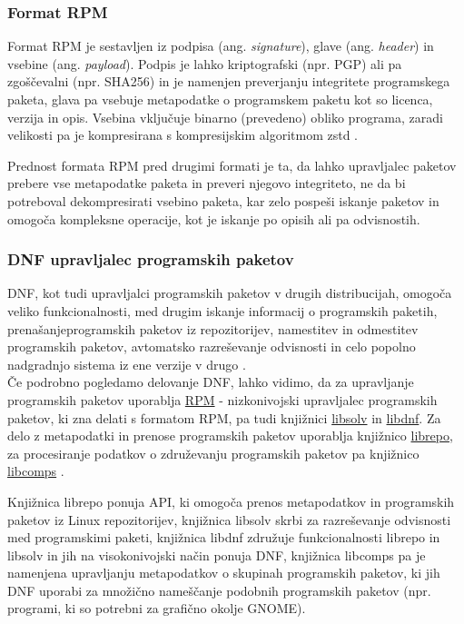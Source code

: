 \subsubsection{Format RPM}

Format RPM je sestavljen iz podpisa (ang. \emph{signature}), glave (ang. \emph{header}) in vsebine
(ang. \emph{payload}).
Podpis je lahko kriptografski (npr. PGP) ali pa zgoščevalni (npr. SHA256) in je namenjen preverjanju integritete
programskega paketa, glava pa vsebuje metapodatke o programskem paketu kot so licenca, verzija in opis.
Vsebina vključuje binarno (prevedeno) obliko programa, zaradi velikosti pa je kompresirana
s kompresijskim algoritmom zstd \cite{fedora-zstd}.

Prednost formata RPM pred drugimi formati je ta, da lahko upravljalec paketov prebere vse metapodatke paketa in preveri
njegovo integriteto, ne da bi potreboval dekompresirati vsebino paketa, kar zelo pospeši iskanje paketov in omogoča
kompleksne operacije, kot je iskanje po opisih ali pa odvisnostih.

\newpage

\subsubsection{DNF upravljalec programskih paketov}

DNF, kot tudi upravljalci programskih paketov v drugih distribucijah, omogoča veliko funkcionalnosti,
med drugim iskanje informacij o programskih paketih, prenašanje\linebreak programskih paketov iz repozitorijev,
namestitev in odmestitev programskih paketov, avtomatsko razreševanje odvisnosti in celo popolno nadgradnjo sistema
iz ene verzije v drugo \cite{fedora-dnf}.\\

Če podrobno pogledamo delovanje DNF, lahko vidimo, da za upravljanje programskih paketov uporablja
\href{http://rpm.org/}{RPM} - nizkonivojski upravljalec programskih paketov, ki zna delati s formatom RPM,
pa tudi knjižnici \href{https://github.com/openSUSE/libsolv}{libsolv} in
\href{https://github.com/rpm-software-management/libdnf}{libdnf}.
Za delo z metapodatki in prenose programskih paketov
uporablja knjižnico \href{https://github.com/rpm-software-management/librepo}{librepo}, za procesiranje podatkov o
združevanju programskih paketov pa knjižnico \href{https://github.com/rpm-software-management/libcomps}{libcomps}
\cite{fedora-dnf-git-repo}.

Knjižnica librepo ponuja API, ki omogoča prenos metapodatkov in programskih paketov iz Linux repozitorijev,
knjižnica libsolv skrbi za razreševanje odvisnosti med programskimi paketi,
knjižnica libdnf združuje funkcionalnosti librepo in libsolv in jih na visokonivojski način ponuja DNF,
knjižnica libcomps pa je namenjena upravljanju metapodatkov o skupinah programskih paketov, ki jih DNF uporabi
za množično nameščanje podobnih programskih paketov (npr. programi, ki so potrebni za grafično okolje GNOME).

